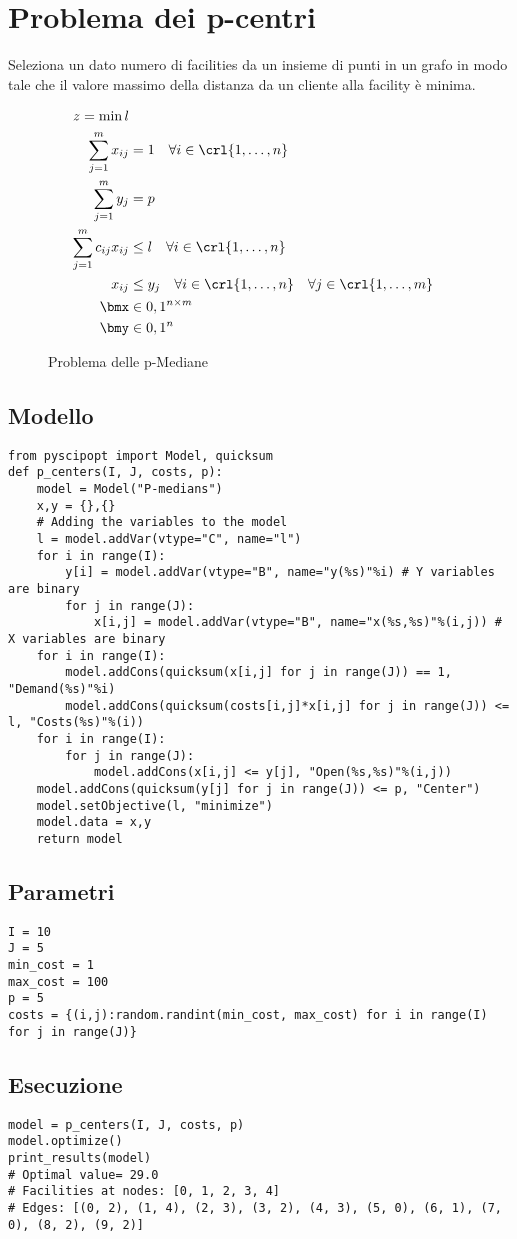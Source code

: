 \documentclass[\main/main.tex]{subfiles}
\begin{document}
\chapter{Problema dei p-centri}
Seleziona un dato numero di facilities da un insieme di punti in un grafo in modo tale che il valore massimo della distanza da un cliente alla facility è minima.

\begin{figure}
    \begin{align*}
        z = \min l \\
        \sum_{j=1}^m x_{ij} &= 1 \quad \forall i \in \crl{1, \ldots, n}\\
        \sum_{j=1}^m y_{j} &= p\\
        \sum_{j=1}^m c_{ij}x_{ij} &\leq l \quad \forall i \in \crl{1, \ldots, n}\\
        x_{ij} &\leq y_j \quad \forall i \in \crl{1, \ldots, n} \quad \forall j \in \crl{1, \ldots, m}\\
        \bmx &\in {0,1}^{n\times m}\\
        \bmy &\in {0,1}^n
    \end{align*}
    \caption{Problema delle p-Mediane}
\end{figure}
\section{Modello}
\begin{verbatim}
from pyscipopt import Model, quicksum
def p_centers(I, J, costs, p):
    model = Model("P-medians")
    x,y = {},{}
    # Adding the variables to the model
    l = model.addVar(vtype="C", name="l")
    for i in range(I):
        y[i] = model.addVar(vtype="B", name="y(%s)"%i) # Y variables are binary
        for j in range(J):
            x[i,j] = model.addVar(vtype="B", name="x(%s,%s)"%(i,j)) # X variables are binary
    for i in range(I):
        model.addCons(quicksum(x[i,j] for j in range(J)) == 1, "Demand(%s)"%i)
        model.addCons(quicksum(costs[i,j]*x[i,j] for j in range(J)) <= l, "Costs(%s)"%(i))
    for i in range(I):
        for j in range(J):
            model.addCons(x[i,j] <= y[j], "Open(%s,%s)"%(i,j))
    model.addCons(quicksum(y[j] for j in range(J)) <= p, "Center")
    model.setObjective(l, "minimize")
    model.data = x,y
    return model
\end{verbatim}
\clearpage
\section{Parametri}
\begin{verbatim}
I = 10
J = 5
min_cost = 1
max_cost = 100
p = 5
costs = {(i,j):random.randint(min_cost, max_cost) for i in range(I) for j in range(J)}
\end{verbatim}
\section{Esecuzione}
\begin{verbatim}
model = p_centers(I, J, costs, p)
model.optimize()
print_results(model)
# Optimal value= 29.0
# Facilities at nodes: [0, 1, 2, 3, 4]
# Edges: [(0, 2), (1, 4), (2, 3), (3, 2), (4, 3), (5, 0), (6, 1), (7, 0), (8, 2), (9, 2)]
\end{verbatim}
\end{document}
